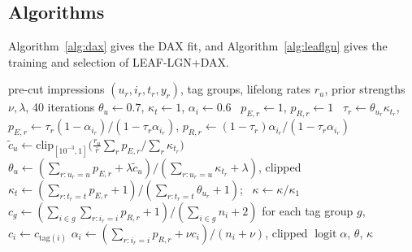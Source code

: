 \documentclass[preprint,12pt,authoryear]{elsarticle}
\begin{document}
\subsection{Algorithms}
\label{sec:method-algorithms}

Algorithm~\ref{alg:dax} gives the DAX fit, and Algorithm~\ref{alg:leaflgn} gives the training and selection of LEAF-LGN+DAX.

\begin{algorithm}[t]
\caption{DAX-EM on the pre-cut log}
\label{alg:dax}
\begin{algorithmic}[1]
\Require pre-cut impressions $(u_r,i_r,t_r,y_r)$, tag groups, lifelong rates $r_u$, prior strengths $\nu,\lambda$, 40 iterations
\State $\theta_u\gets 0.7$, $\kappa_t\gets 1$, $\alpha_i\gets 0.6$
   
    \ $p_{E,r}\gets 1$, $p_{R,r}\gets 1$
    \Else\ $\tau_r\gets\theta_{u_r}\kappa_{t_r}$, $p_{E,r}\gets\tau_r(1-\alpha_{i_r})/(1-\tau_r\alpha_{i_r})$,
      $p_{R,r}\gets(1-\tau_r)\alpha_{i_r}/(1-\tau_r\alpha_{i_r})$
    \EndIf
  \EndFor
  \State $\tilde c_u\gets\mathrm{clip}_{[10^{-3},1]}\bigl(\tfrac{r_u}{\bar r}\sum_r p_{E,r}/\sum_r\kappa_{t_r}\bigr)$ 
  \State $\theta_u\gets(\sum_{r:u_r=u}p_{E,r}+\lambda\tilde c_u)/(\sum_{r:u_r=u}\kappa_{t_r}+\lambda)$, clipped
  \State $\kappa_t\gets(\sum_{r:t_r=t}p_{E,r}+1)/(\sum_{r:t_r=t}\theta_{u_r}+1)$; \ $\kappa\gets\kappa/\kappa_1$
  \State $c_g\gets(\sum_{i\in g}\sum_{r:i_r=i}p_{R,r}+1)/(\sum_{i\in g}n_i+2)$ for each tag group $g$, \ $c_i\gets c_{\mathrm{tag}(i)}$
  \State $\alpha_i\gets(\sum_{r:i_r=i}p_{R,r}+\nu c_i)/(n_i+\nu)$, clipped
\EndFor
\State \Return $\operatorname{logit}\alpha$, $\theta$, $\kappa$
\end{algorithmic}
\end{algorithm}
\end{document}
